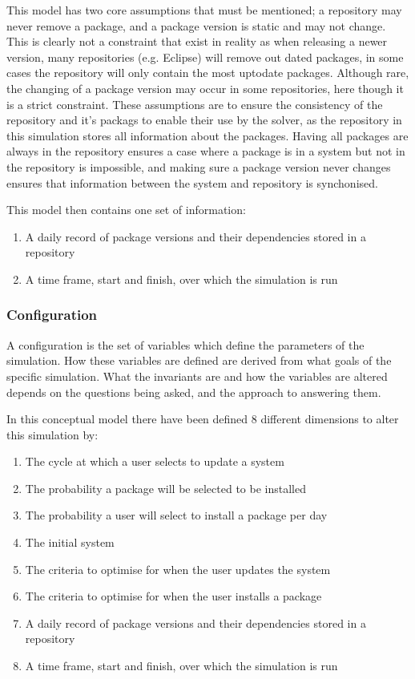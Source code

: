 This model has two core assumptions that must be mentioned; a repository may never remove a package, and a package version is static and may not change.
This is clearly not a constraint that exist in reality as when releasing a newer version, many repositories (e.g. Eclipse) will remove out dated packages,
in some cases the repository will only contain the most uptodate packages.
Although rare, the changing of a package version may occur in some repositories, here though it is a strict constraint.
These assumptions are to ensure the consistency of the repository and it's packags to enable their use by the solver, 
as the repository in this simulation stores all information about the packages.
Having all packages are always in the repository ensures a case where a package is in a system but not in the repository is impossible,
and making sure a package version never changes ensures that information between the system and repository is synchonised.  

This model then contains one set of information:
\begin{enumerate}
  \item A daily record of package versions and their dependencies stored in a repository
  \item A time frame, start and finish, over which the simulation is run
\end{enumerate}

\subsubsection{Configuration}
A configuration is the set of variables which define the parameters of the simulation.
How these variables are defined are derived from what goals of the specific simulation.
What the invariants are and how the variables are altered depends on the questions being asked, and the approach to answering them.

In this conceptual model there have been defined 8 different dimensions to alter this simulation by:
\begin{enumerate}
  \item The cycle at which a user selects to update a system
  \item The probability a package will be selected to be installed
  \item The probability a user will select to install a package per day
  \item The initial system
  \item The criteria to optimise for when the user updates the system
  \item The criteria to optimise for when the user installs a package
  \item A daily record of package versions and their dependencies stored in a repository
  \item A time frame, start and finish, over which the simulation is run
\end{enumerate}

